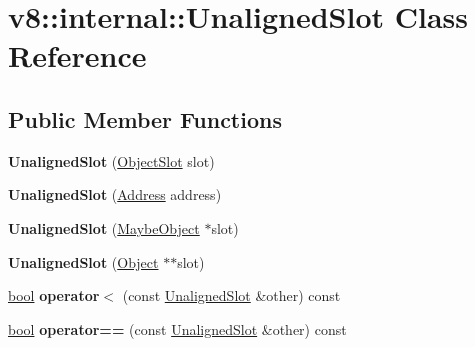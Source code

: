 \hypertarget{classv8_1_1internal_1_1UnalignedSlot}{}\section{v8\+:\+:internal\+:\+:Unaligned\+Slot Class Reference}
\label{classv8_1_1internal_1_1UnalignedSlot}
\subsection*{Public Member Functions}
\begin{DoxyCompactItemize}
\item 
\mbox{\label{classv8_1_1internal_1_1UnalignedSlot_a46ad5c6b6ff243be342efe55c17e9e15}} 
{\bfseries Unaligned\+Slot} (\mbox{\hyperlink{classv8_1_1internal_1_1ObjectSlot}{Object\+Slot}} slot)
\item 
\mbox{\label{classv8_1_1internal_1_1UnalignedSlot_aaef1797ef497de50195463b435a5cc57}} 
{\bfseries Unaligned\+Slot} (\mbox{\hyperlink{classuintptr__t}{Address}} address)
\item 
\mbox{\label{classv8_1_1internal_1_1UnalignedSlot_a4df8a3068cd324220a8ab73d00faf0af}} 
{\bfseries Unaligned\+Slot} (\mbox{\hyperlink{classv8_1_1internal_1_1MaybeObject}{Maybe\+Object}} $\ast$slot)
\item 
\mbox{\label{classv8_1_1internal_1_1UnalignedSlot_a1ad09e55d1ef3472759ee809fc2b997f}} 
{\bfseries Unaligned\+Slot} (\mbox{\hyperlink{classv8_1_1internal_1_1Object}{Object}} $\ast$$\ast$slot)
\item 
\mbox{\label{classv8_1_1internal_1_1UnalignedSlot_ae327559ad6a4320ca47ee0e0c4ec895a}} 
\mbox{\hyperlink{classbool}{bool}} {\bfseries operator$<$} (const \mbox{\hyperlink{classv8_1_1internal_1_1UnalignedSlot}{Unaligned\+Slot}} \&other) const
\item 
\mbox{\label{classv8_1_1internal_1_1UnalignedSlot_ae7455a142b2ee0a61ecf886d1b3370a9}} 
\mbox{\hyperlink{classbool}{bool}} {\bfseries operator==} (const \mbox{\hyperlink{classv8_1_1internal_1_1UnalignedSlot}{Unaligned\+Slot}} \&other) const
$$
\end{DoxyCompactItemize}
